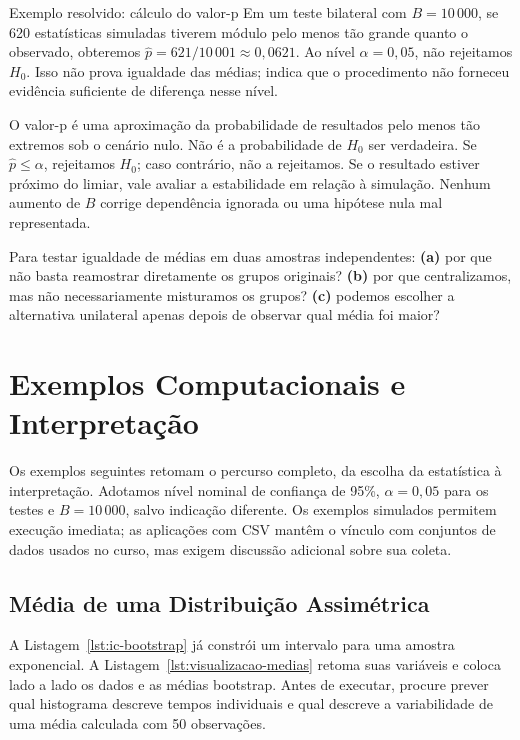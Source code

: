 \documentclass[12pt,a4paper]{article}
\begin{document}
\begin{exemplobox}{Exemplo resolvido: cálculo do valor-p}
Em um teste bilateral com $B=10\,000$, se 620 estatísticas simuladas tiverem módulo pelo menos tão grande quanto o observado, obteremos $\hat p=621/10\,001\approx0{,}0621$. Ao nível $\alpha=0{,}05$, não rejeitamos $H_0$. Isso não prova igualdade das médias; indica que o procedimento não forneceu evidência suficiente de diferença nesse nível.
\end{exemplobox}

O valor-p é uma aproximação da probabilidade de resultados pelo menos tão extremos sob o cenário nulo. Não é a probabilidade de $H_0$ ser verdadeira. Se $\hat p\leq\alpha$, rejeitamos $H_0$; caso contrário, não a rejeitamos. Se o resultado estiver próximo do limiar, vale avaliar a estabilidade em relação à simulação. Nenhum aumento de $B$ corrige dependência ignorada ou uma hipótese nula mal representada.

\begin{perguntabox}
Para testar igualdade de médias em duas amostras independentes: \textbf{(a)} por que não basta reamostrar diretamente os grupos originais? \textbf{(b)} por que centralizamos, mas não necessariamente misturamos os grupos? \textbf{(c)} podemos escolher a alternativa unilateral apenas depois de observar qual média foi maior?
\end{perguntabox}

\section{Exemplos Computacionais e Interpretação}
\label{sec:exemplos}
Os exemplos seguintes retomam o percurso completo, da escolha da estatística à interpretação. Adotamos nível nominal de confiança de 95\%, $\alpha=0{,}05$ para os testes e $B=10\,000$, salvo indicação diferente. Os exemplos simulados permitem execução imediata; as aplicações com CSV mantêm o vínculo com conjuntos de dados usados no curso, mas exigem discussão adicional sobre sua coleta.

\subsection{Média de uma Distribuição Assimétrica}
A Listagem~\ref{lst:ic-bootstrap} já constrói um intervalo para uma amostra exponencial. A Listagem~\ref{lst:visualizacao-medias} retoma suas variáveis e coloca lado a lado os dados e as médias bootstrap. Antes de executar, procure prever qual histograma descreve tempos individuais e qual descreve a variabilidade de uma média calculada com 50 observações.
\end{document}
